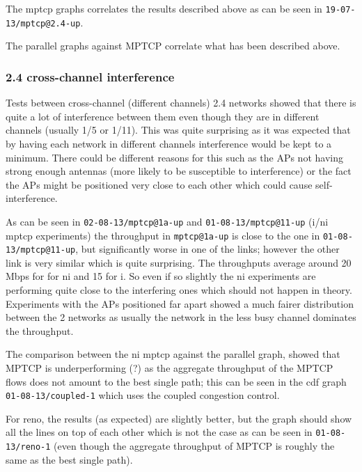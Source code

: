 \documentclass[12pt,a4paper]{article}
\begin{document}
The mptcp graphs correlates the results described above as can be seen in
\texttt{19-07-13/mptcp@2.4-up}.

The parallel graphs against MPTCP correlate what has been described above.

\subsubsection{2.4 cross-channel interference}
Tests between cross-channel (different channels) 2.4 networks showed that there
is quite a lot of interference between them even though they are in different
channels (usually 1/5 or 1/11). This was quite surprising as it was expected
that by having each network in different channels interference would be kept to
a minimum. There could be different reasons for this such as the APs not having
strong enough antennas (more likely to be susceptible to interference) or the
fact the APs might be positioned very close to each other which could cause
self-interference.

As can be seen in \texttt{02-08-13/mptcp@1a-up} and
\texttt{01-08-13/mptcp@11-up} (i/ni mptcp experiments) the throughput in
\texttt{mptcp@1a-up} is close to the one in \texttt{01-08-13/mptcp@11-up}, but
significantly worse in one of the links; however the other link is very similar
which is quite surprising. The throughputs average around 20 Mbps for for ni and
15 for i. So even if so slightly the ni experiments are performing quite close
to the interfering ones which should not happen in theory. Experiments with the
APs positioned far apart showed a much fairer distribution between the 2
networks as usually the network in the less busy channel dominates the
throughput.

The comparison between the ni mptcp against the parallel graph, showed that
MPTCP is underperforming (?) as the aggregate throughput of the MPTCP flows does
not amount to the best single path; this can be seen in the cdf graph
\texttt{01-08-13/coupled-1} which uses the coupled congestion control.

For reno, the results (as expected) are slightly better, but the graph should
show all the lines on top of each other which is not the case as can be seen in
\texttt{01-08-13/reno-1} (even though the aggregate throughput of MPTCP is
roughly the same as the best single path).
\end{document}
